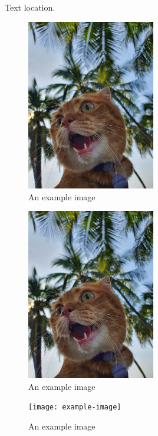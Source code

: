 \documentclass{article}
\begin{document}
\lipsum[13-17]
Text location.
\begin{figure}[h] %
	\centering %
	\includegraphics[width=0.5\textwidth, angle=75, scale=0.5]{garfield.JPG}
	\caption{An example image}
\end{figure}
\lipsum[18-25]

\begin{figure}[bp] %
	\centering %
	\includegraphics[width=0.5\textwidth, angle=75, scale=0.5]{garfield.JPG}
	\caption{An example image}
\end{figure}

\lipsum[26-30]
\begin{figure}[ht] %
	\centering %
	\texttt{[image: example-image]}
	\caption{An example image}
\end{figure}
\end{document}
